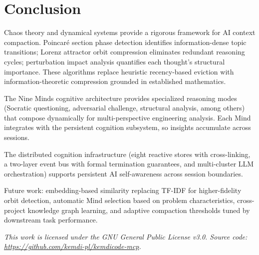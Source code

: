 \documentclass[journal,10pt]{IEEEtran}
\begin{document}
\section{Conclusion}
\label{sec:conclusion}

Chaos theory and dynamical systems provide a rigorous framework for AI context compaction. Poincar\'{e} section phase detection identifies information-dense topic transitions; Lorenz attractor orbit compression eliminates redundant reasoning cycles; perturbation impact analysis quantifies each thought's structural importance. These algorithms replace heuristic recency-based eviction with information-theoretic compression grounded in established mathematics.

The Nine Minds cognitive architecture provides specialized reasoning modes (Socratic questioning, adversarial challenge, structural analysis, among others) that compose dynamically for multi-perspective engineering analysis. Each Mind integrates with the persistent cognition subsystem, so insights accumulate across sessions.

The distributed cognition infrastructure (eight reactive stores with cross-linking, a two-layer event bus with formal termination guarantees, and multi-cluster LLM orchestration) supports persistent AI self-awareness across session boundaries.

Future work: embedding-based similarity replacing TF-IDF for higher-fidelity orbit detection, automatic Mind selection based on problem characteristics, cross-project knowledge graph learning, and adaptive compaction thresholds tuned by downstream task performance.

\smallskip\noindent\textit{This work is licensed under the GNU General Public License v3.0. Source code: \url{https://github.com/kemdi-pl/kemdicode-mcp}.}
\end{document}

